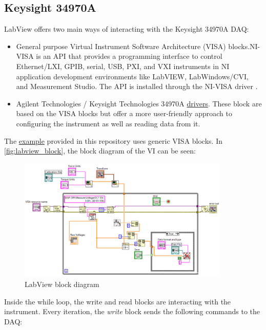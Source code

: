 \documentclass[a4paper]{article}
\begin{document}
\subsection{Keysight 34970A}

LabView offers two main ways of interacting with the Keysight 34970A DAQ:

\begin{itemize}
	\item General purpose Virtual Instrument Software Architecture (VISA) blocks.NI-VISA is an API that provides a programming interface to control Ethernet/LXI, GPIB, serial, USB, PXI, and VXI instruments in NI application development environments like LabVIEW, LabWindows/CVI, and Measurement Studio. The API is installed through the NI-VISA driver \cite{NIVISA}.
	\item Agilent Technologies / Keysight Technologies 34970A \hyperref{http://sine.ni.com/apps/utf8/niid_web_display.model_page?p_model_id=5547}{category}{name}{drivers}. These block are based on the VISA blocks but offer a more user-friendly approach to configuring the instrument as well as reading data from it. 
\end{itemize}

The \hyperref{https://github.com/IrisDuMutel/ATIMini40_software/tree/master/LabView}{cat1}{visa}{example}  provided in this repository uses generic VISA blocks. In \autoref{fig:labview_block}, the block diagram of the VI can be seen:

\begin{figure}[!h]
	\centering
	\includegraphics[width=0.9\textwidth]{labview_block.png}
	\caption{LabView block diagram}
	\label{fig:labview_block}
\end{figure}

Inside the while loop, the write and read blocks are interacting with the instrument. Every iteration, the \textit{write} block sends the following commands to the DAQ:
\end{document}
